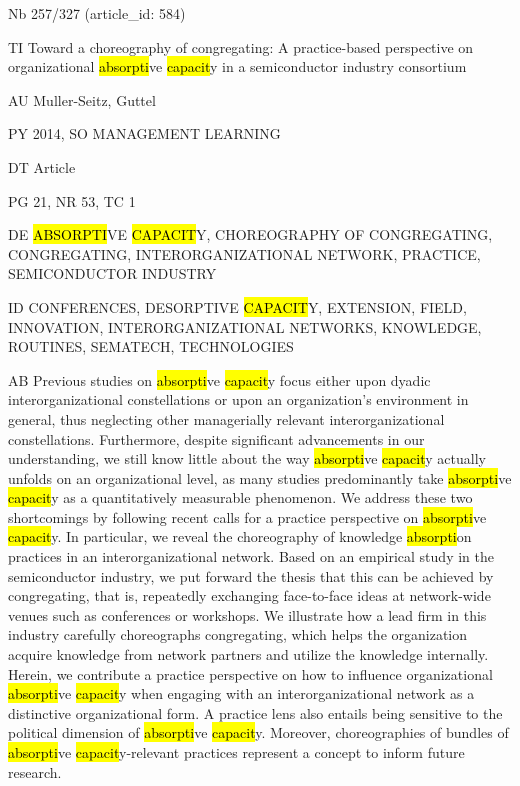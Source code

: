 \documentclass[a4paper]{article}
\begin{document}
\vspace*{-2cm}
Nb \tabto{0cm}257/327 (article\_id: 584)\par
TI \tabto{0cm}Toward a choreography of congregating: A practice-based perspective on organizational \hl{absorpti}ve \hl{capacit}y in a semiconductor industry consortium\par
AU \tabto{0cm}Muller-Seitz, Guttel\par
PY \tabto{0cm}2014, SO MANAGEMENT LEARNING\par
DT \tabto{0cm}Article\par
PG \tabto{0cm}21, NR 53, TC 1\par
DE \tabto{0cm}\hl{ABSORPTI}VE \hl{CAPACIT}Y, CHOREOGRAPHY OF CONGREGATING, CONGREGATING, INTERORGANIZATIONAL NETWORK, PRACTICE, SEMICONDUCTOR INDUSTRY\par
ID \tabto{0cm}CONFERENCES, DESORPTIVE \hl{CAPACIT}Y, EXTENSION, FIELD, INNOVATION, INTERORGANIZATIONAL NETWORKS, KNOWLEDGE, ROUTINES, SEMATECH, TECHNOLOGIES\par
AB \tabto{0cm}Previous studies on \hl{absorpti}ve \hl{capacit}y focus either upon dyadic interorganizational constellations or upon an organization's environment in general, thus neglecting other managerially relevant interorganizational constellations. Furthermore, despite significant advancements in our understanding, we still know little about the way \hl{absorpti}ve \hl{capacit}y actually unfolds on an organizational level, as many studies predominantly take \hl{absorpti}ve \hl{capacit}y as a quantitatively measurable phenomenon. We address these two shortcomings by following recent calls for a practice perspective on \hl{absorpti}ve \hl{capacit}y. In particular, we reveal the choreography of knowledge \hl{absorpti}on practices in an interorganizational network. Based on an empirical study in the semiconductor industry, we put forward the thesis that this can be achieved by congregating, that is, repeatedly exchanging face-to-face ideas at network-wide venues such as conferences or workshops. We illustrate how a lead firm in this industry carefully choreographs congregating, which helps the organization acquire knowledge from network partners and utilize the knowledge internally. Herein, we contribute a practice perspective on how to influence organizational \hl{absorpti}ve \hl{capacit}y when engaging with an interorganizational network as a distinctive organizational form. A practice lens also entails being sensitive to the political dimension of \hl{absorpti}ve \hl{capacit}y. Moreover, choreographies of bundles of \hl{absorpti}ve \hl{capacit}y-relevant practices represent a concept to inform future research.\par
\clearpage
\end{document}
